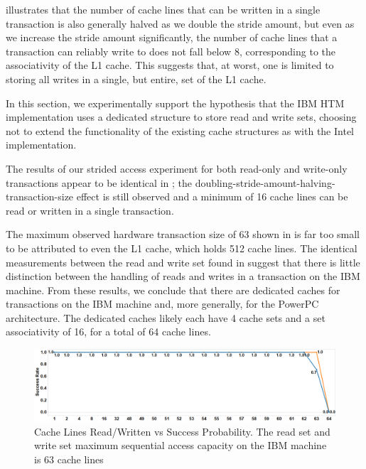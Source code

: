 illustrates that the number of cache
lines that can be written in a single transaction 
is also generally halved as we
double the stride amount, but even as we increase the stride amount
significantly, the number of cache lines that a 
transaction can reliably write
to does not fall below 8, corresponding to the associativity 
of the L1 cache.  This suggests that, at worst, one is limited 
to storing all writes in a single, but entire, set of the L1 cache.


In this section, we experimentally support the hypothesis
that the IBM HTM implementation uses a dedicated structure
to store read and write sets, choosing not to extend the 
functionality of the existing cache structures as with
the Intel implementation.

The results of our strided access experiment for 
both read-only and write-only
transactions appear to be identical in
; the
doubling-stride-amount-halving-transaction-size 
effect is still observed and a
minimum of 16 cache lines can be read or written in a single transaction.

The maximum observed hardware transaction size of 
63 shown in  is far too
small to be attributed to even the {L1} cache, which holds 512 cache
lines. The identical measurements between the read and write set 
found in 
 suggest that there is little distinction
between the handling of reads and writes in a transaction on the IBM machine.
From these results, we conclude that there are dedicated caches for transactions
on the IBM machine and, more generally, for the PowerPC architecture. The
dedicated caches likely each have 4 cache sets and a set associativity of 16,
for a total of 64 cache lines.

\begin{figure}[]%
\centering
\includegraphics[width=\linewidth]{images/wttm_capacity_readwrite_ibm}
\caption{Cache Lines Read/Written vs Success Probability. 
The read set and write set maximum sequential access capacity on the
IBM machine is 63 cache lines}
\label{fig:wttm_capacity_readwrite_ibm}
\end{figure}

